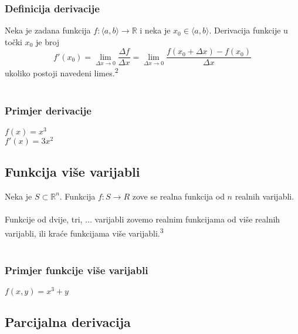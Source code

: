 \documentclass{article}
\begin{document}
\subsubsection{Definicija derivacije}
Neka je zadana funkcija $f:〈a,b〉 \rightarrow \mathbb{R}$ i neka je $x_0 \in 〈a,b〉$. Derivacija funkcije u točki $x_0$ je broj
$$
f'(x_0) = \lim\limits_{\Delta x \rightarrow 0} \frac{\Delta f}{\Delta x} = \lim\limits_{\Delta x \rightarrow 0} \frac{f(x_0 + \Delta x) - f(x_0)}{\Delta x}
$$ 
ukoliko postoji navedeni limes.\textsuperscript{2}
\\~\\
\subsubsection{Primjer derivacije}
$f(x) = x^3$
\\
$f'(x) = 3x^2$

\pagebreak

\subsection{Funkcija više varijabli}
Neka je $S \subset \mathbb{R}^n$. Funkcija $f : S \rightarrow R$ zove se realna funkcija od $n$ realnih varijabli.
\\~\\
Funkcije od dvije, tri, $ \ldots$ varijabli zovemo realnim funkcijama od više realnih varijabli, ili kraće funkcijama više varijabli.\textsuperscript{3}
\\~\\
\subsubsection{Primjer funkcije više varijabli}
$f(x,y) = x^3 + y$

\pagebreak

\subsection{Parcijalna derivacija}
\end{document}
